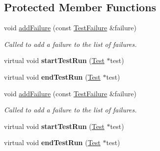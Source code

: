 \subsection*{Protected Member Functions}
\begin{DoxyCompactItemize}
\item 
\hypertarget{class_test_result_aa423474527cbc89141763ea41336a188}{void \hyperlink{class_test_result_aa423474527cbc89141763ea41336a188}{add\+Failure} (const \hyperlink{class_test_failure}{Test\+Failure} \&failure)}\label{class_test_result_aa423474527cbc89141763ea41336a188}

\begin{DoxyCompactList}\small\item\em Called to add a failure to the list of failures. \end{DoxyCompactList}\item 
\hypertarget{class_test_result_a486c80935862e662b50dfe738bdc3330}{virtual void {\bfseries start\+Test\+Run} (\hyperlink{class_test}{Test} $\ast$test)}\label{class_test_result_a486c80935862e662b50dfe738bdc3330}

\item 
\hypertarget{class_test_result_aaa37ea2e0b61b541545132b8225bfb12}{virtual void {\bfseries end\+Test\+Run} (\hyperlink{class_test}{Test} $\ast$test)}\label{class_test_result_aaa37ea2e0b61b541545132b8225bfb12}

\item 
\hypertarget{class_test_result_aa423474527cbc89141763ea41336a188}{void \hyperlink{class_test_result_aa423474527cbc89141763ea41336a188}{add\+Failure} (const \hyperlink{class_test_failure}{Test\+Failure} \&failure)}\label{class_test_result_aa423474527cbc89141763ea41336a188}

\begin{DoxyCompactList}\small\item\em Called to add a failure to the list of failures. \end{DoxyCompactList}\item 
\hypertarget{class_test_result_a6263b1ca50fa6bf504332e181bf75670}{virtual void {\bfseries start\+Test\+Run} (\hyperlink{class_test}{Test} $\ast$test)}\label{class_test_result_a6263b1ca50fa6bf504332e181bf75670}

\item 
\hypertarget{class_test_result_a9721fc94b9991cfd3efde322701ebf70}{virtual void {\bfseries end\+Test\+Run} (\hyperlink{class_test}{Test} $\ast$test)}\label{class_test_result_a9721fc94b9991cfd3efde322701ebf70}

\end{DoxyCompactItemize}
